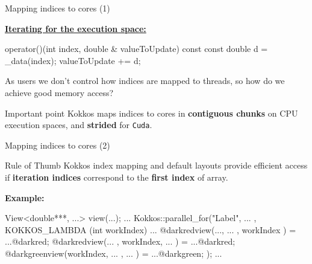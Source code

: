 
\ifmedium
\begin{frame}[fragile]{Mapping indices to cores (1)}

  \ul{\textbf{Iterating for the execution space:}}

  \begin{code}[keywords={}]
operator()(int index, double & valueToUpdate) const {
  const double d = _data(index);
  valueToUpdate += d;
}
  \end{code}

  \vspace{5pt}

  As users we don't control how indices are mapped to threads, so how do we achieve good memory access?

  \pause
  \vspace{3pt}

  \begin{block}{Important point}
    Kokkos maps indices to cores in \textbf{contiguous chunks} on CPU execution spaces, and \textbf{strided} for \texttt{Cuda}.
  \end{block}

\end{frame}
\fi


\begin{frame}[fragile]{Mapping indices to cores (2)}

  \begin{block}{Rule of Thumb}
    Kokkos index mapping and default layouts provide efficient access if \textbf{iteration indices} correspond to the \textbf{first index} of array.
  \end{block}

  \vspace{10pt}

  \textbf{Example:}

  \vspace{5pt}

  \begin{code}[keywords={}, frame=single]
  View<double***, ...> view(...);
  ...
  Kokkos::parallel_for("Label", ... ,
    KOKKOS_LAMBDA (int workIndex) {
      ...
      @darkredview(..., ... , workIndex ) = ...@darkred;
      @darkredview(... , workIndex, ... ) = ...@darkred;
      @darkgreenview(workIndex, ... , ... ) = ...@darkgreen;
    });
  ...
  \end{code}

\end{frame}


